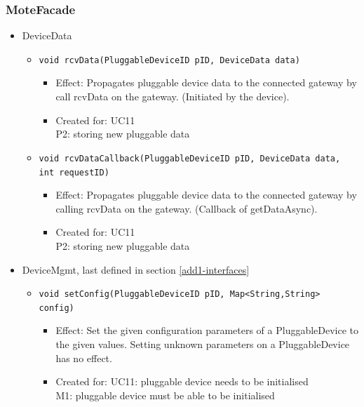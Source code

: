     \subsubsection{MoteFacade}
        \begin{itemize}
            \item DeviceData
            \begin{itemize}
                \item \texttt{void rcvData(PluggableDeviceID pID, DeviceData data)}
                    \begin{itemize}
                        \item Effect: Propagates pluggable device data to
                              the connected gateway by call rcvData on the gateway.
                              (Initiated by the device).
                        \item Created for: UC11 \\
                              P2: storing new pluggable data
                    \end{itemize}
                \item \texttt{void rcvDataCallback(PluggableDeviceID pID, DeviceData data, int requestID)}
                    \begin{itemize}
                        \item Effect: Propagates pluggable device data to the
                              connected gateway by calling rcvData on the gateway.
                              (Callback of getDataAsync).
                        \item Created for: UC11 \\
                              P2: storing new pluggable data
                    \end{itemize}
            \end{itemize}

            \item DeviceMgmt, last defined in section \ref{add1-interfaces}
            \begin{itemize}
                \item \texttt{void setConfig(PluggableDeviceID pID, Map<String,String> config)}
                \begin{itemize}
                    \item Effect: Set the given configuration parameters of a
                          PluggableDevice to the given values. Setting unknown parameters
                          on a PluggableDevice has no effect.
                    \item Created for: UC11: pluggable device needs to be initialised \\
                          M1: pluggable device must be able to be initialised
                \end{itemize}
            \end{itemize}
        \end{itemize}

